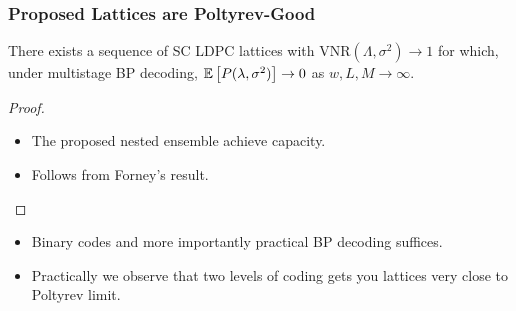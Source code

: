 \documentclass[10pt,presentation]{beamer}
\begin{document}
\begin{frame}\frametitle{Proposed Lattices are Poltyrev-Good}
\begin{theorem}
There exists a sequence of SC LDPC lattices with VNR$(\Lambda,\sigma^{2})\rightarrow 1$ for which, under multistage BP decoding, $\mathbb{E}\left[P(\lambda,\sigma^{2})\right]\rightarrow 0$ as $w,L,M  \rightarrow \infty$.
\end{theorem}    
\begin{proof}
\begin{itemize}
\item The proposed nested ensemble achieve capacity.
\item Follows from Forney's result.
\end{itemize}

\end{proof}
\vspace{0.3in}
\pause
\begin{itemize}
        \item {\blue Binary codes} and more importantly {\blue practical BP decoding} suffices. 
        \item Practically we observe that {\blue two levels} of coding gets you lattices very close to Poltyrev limit.
    \end{itemize}
\end{frame}
	
\end{document}
